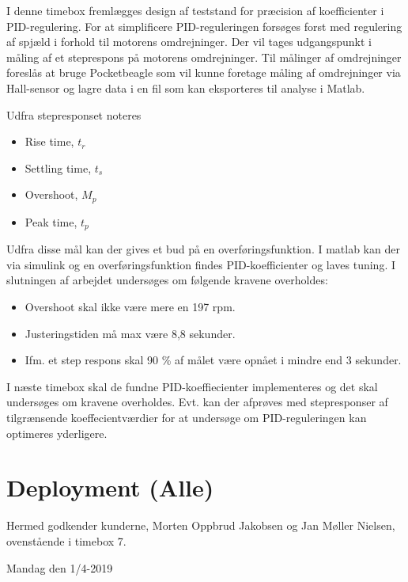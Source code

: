 I denne timebox fremlægges design af teststand for præcision af koefficienter i PID-regulering. For at simplificere PID-reguleringen forsøges forst med regulering af spjæld i forhold til motorens omdrejninger. Der vil tages udgangspunkt i måling af et steprespons på motorens omdrejninger. Til målinger af omdrejninger foreslås at bruge Pocketbeagle som vil kunne foretage måling af omdrejninger via Hall-sensor og lagre data i en fil som kan eksporteres til analyse i Matlab.

Udfra stepresponset noteres

\begin{itemize}
\item Rise time, $t_r$
\item Settling time, $t_s$
\item Overshoot, $M_p$
\item Peak time, $t_p$
\end{itemize}

Udfra disse mål kan der gives et bud på en overføringsfunktion. I matlab kan der via simulink og en overføringsfunktion findes PID-koefficienter og laves tuning. I slutningen af arbejdet undersøges om følgende kravene overholdes:
\begin{itemize}
\item Overshoot skal ikke være mere en 197 rpm.
\item Justeringstiden må max være 8,8 sekunder.
\item Ifm. et step respons skal 90 \% af målet være opnået i mindre end 3 sekunder.
\end{itemize}

I næste timebox skal de fundne PID-koeffiecienter implementeres og det skal undersøges om kravene overholdes. Evt. kan der afprøves med stepresponser af tilgrænsende koeffecientværdier for at undersøge om PID-reguleringen kan optimeres yderligere.


\section{Deployment (Alle)}
\label{sec:deployment}

Hermed godkender kunderne, Morten Oppbrud Jakobsen og Jan Møller Nielsen, ovenstående i timebox 7.

Mandag den 1/4-2019

